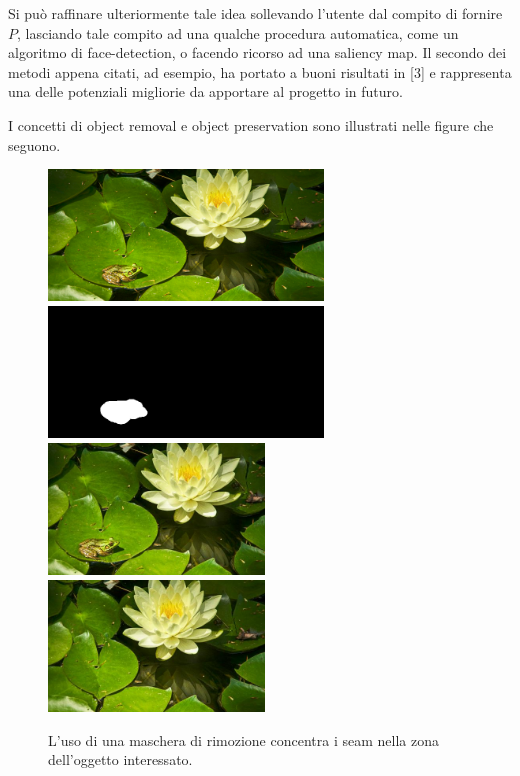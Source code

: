 \documentclass[12pt,a4paper]{report}
\theoremstyle{plain}
\theoremstyle{definition}
\begin{document}
Si può raffinare ulteriormente tale idea sollevando l'utente dal compito di fornire $P$, lasciando tale compito ad una qualche procedura automatica, come un algoritmo di face-detection, o facendo ricorso ad una saliency map. Il secondo dei metodi appena citati, ad esempio, ha portato a buoni risultati in [3] e rappresenta una delle potenziali migliorie da apportare al progetto in futuro. 

I concetti di object removal e object preservation sono illustrati nelle figure che seguono.

\begin{figure}[h]
\centering
\includegraphics[height=3.5cm]{frog}
\includegraphics[height=3.5cm]{frogmask}
\vskip 0.1cm
\includegraphics[height=3.5cm]{frogsmall}
\includegraphics[height=3.5cm]{frogerase}
\caption{L'uso di una maschera di rimozione concentra i seam nella zona dell'oggetto interessato.}
\label{preserve}
\end{figure}
\end{document}
